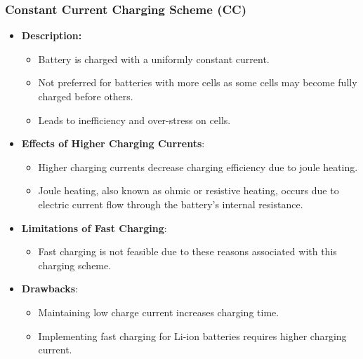 \documentclass[conference]{IEEEtran}
\begin{document}
\subsubsection{Constant Current Charging Scheme (CC) }
\begin{itemize}
    \item \textbf{Description:}
    \begin{itemize}
        \item Battery is charged with a uniformly constant current.
        \item Not preferred for batteries with more cells as some cells may become fully charged before others.
        \item Leads to inefficiency and over-stress on cells.
    \end{itemize}
        
    \item \textbf{Effects of Higher Charging Currents}:
    \begin{itemize}
        \item Higher charging currents decrease charging efficiency due to joule heating.
        \item Joule heating, also known as ohmic or resistive heating, occurs due to electric current flow through the battery's internal resistance.
    \end{itemize}
    
    \item \textbf{Limitations of Fast Charging}:
    \begin{itemize}
        \item Fast charging is not feasible due to these reasons associated with this charging scheme.
    \end{itemize}
    
    \item \textbf{Drawbacks}:
    \begin{itemize}
        \item Maintaining low charge current increases charging time.
        \item Implementing fast charging for Li-ion batteries requires higher charging current.
    \end{itemize}
\end{itemize}
\end{document}
